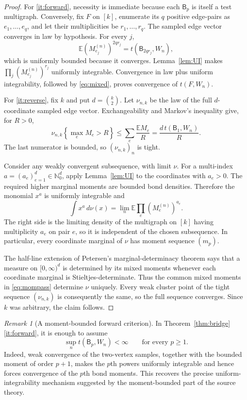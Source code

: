 \documentclass[11pt]{article}
\theoremstyle{remark}
\newtheorem{remark}[theorem]{Remark}
\newcommand{\N}{\mathbb N}
\newcommand{\Ee}{\mathbb E}
\newcommand{\Bn}{\mathsf B}
\begin{document}
\begin{proof}
For \ref{it:forward}, necessity is immediate because each $\Bn_p$ is itself a
test multigraph.  Conversely, fix $F$ on $[k]$, enumerate its $q$ positive
edge-pairs as $e_1,\ldots,e_q$, and let their multiplicities be
$r_1,\ldots,r_q$.  The sampled edge vector converges in law by hypothesis.
For every $j$,
\[
 \Ee (M_{e_j}^{(n)})^{2qr_j}=t(\Bn_{2qr_j},W_n),
\]
which is uniformly bounded because it converges.  Lemma~\ref{lem:UI} makes
$\prod_j(M_{e_j}^{(n)})^{r_j}$ uniformly integrable.  Convergence in law plus
uniform integrability, followed by \eqref{eq:mixed}, proves convergence of
$t(F,W_n)$.

For \ref{it:reverse}, fix $k$ and put $d=\binom{k}{2}$.  Let $\nu_{n,k}$ be
the law of the full $d$-coordinate sampled edge vector.  Exchangeability and
Markov's inequality give, for $R>0$,
\begin{equation}\label{eq:tight}
 \nu_{n,k}\!\left\{\max_e M_e>R\right\}
 \leq \sum_e\frac{\Ee M_e}{R}
 =\frac{d\,t(\Bn_1,W_n)}{R}.
\end{equation}
The last numerator is bounded, so $(\nu_{n,k})_n$ is tight.

Consider any weakly convergent subsequence, with limit $\nu$.  For a
multi-index $a=(a_e)_{e=1}^d\in\N_0^d$, apply Lemma~\ref{lem:UI} to the
coordinates with $a_e>0$.  The required higher marginal moments are bounded
bond densities.  Therefore the monomial $x^a$ is uniformly integrable and
\begin{equation}\label{eq:mompass}
 \int x^a\,d\nu(x)
 =\lim_n \Ee\prod_e(M_e^{(n)})^{a_e}.
\end{equation}
The right side is the limiting density of the multigraph on $[k]$ having
multiplicity $a_e$ on pair $e$, so it is independent of the chosen
subsequence.  In particular, every coordinate marginal of $\nu$ has moment
sequence $(m_p)$.

The half-line extension of Petersen's marginal-determinacy theorem
\cite{DLY,Petersen} says that a measure on $[0,\infty)^d$ is determined by its
mixed moments whenever each coordinate marginal is Stieltjes-determinate.
Thus the common mixed moments in \eqref{eq:mompass} determine $\nu$ uniquely.
Every weak cluster point of the tight sequence $(\nu_{n,k})$ is consequently
the same, so the full sequence converges.  Since $k$ was arbitrary, the claim
follows.
\end{proof}

\begin{remark}[A moment-bounded forward criterion]\label{rem:bounded}
In Theorem~\ref{thm:bridge}\ref{it:forward}, it is enough to assume
\[
 \sup_n t(\Bn_p,W_n)<\infty\qquad\text{for every }p\geq1.
\]
Indeed, weak convergence of the two-vertex samples, together with the bounded
moment of order $p+1$, makes the $p$th powers uniformly integrable and hence
forces convergence of the $p$th bond moments.  This recovers the precise
uniform-integrability mechanism suggested by the moment-bounded part of the
source theory.
\end{remark}
\end{document}
